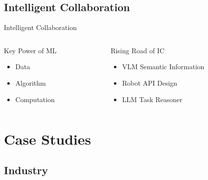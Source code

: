 \documentclass{beamer}
\begin{document}
\subsection{Intelligent Collaboration}
\begin{frame}{Intelligent Collaboration \cite{Ji2024}}

\begin{columns}[onlytextwidth]

\begin{column}{0.5\textwidth}
\centering
\large
Key Power of ML
\footnotesize
\vspace{2mm}
\begin{itemize}
\item Data \cite{naturestatistical, paul2023deeplearningdatadiet, karla2024data}
\vspace{5mm}
\item Algorithm \cite{Blum1998, 7724478, bp}
\vspace{5mm}
\item Computation \cite{kaplan2020scalinglawsneurallanguage}
\end{itemize}
\end{column}

\begin{column}{0.5\textwidth}
\centering
\large
Rising Road of IC
\footnotesize
\vspace{2mm}
\begin{itemize}
\item VLM Semantic Information \cite{radford2021learningtransferablevisualmodels, ravi2024sam2segmentimages}
\vspace{5mm}
\item Robot API Design \cite{vemprala2023gridplatformgeneralrobot, ros2}
\vspace{5mm}
\item LLM Task Reasoner \cite{Lin2023, driess2023palmeembodiedmultimodallanguage}
\end{itemize}
\end{column}

\end{columns}
\end{frame}

\section{Case Studies}

\subsection{Industry}
\end{document}
